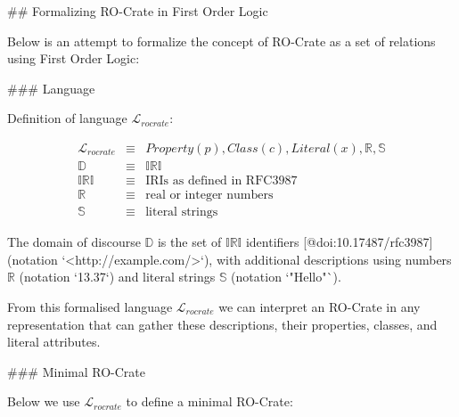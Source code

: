 


\begin{markdown}
## Formalizing RO-Crate in First Order Logic

Below is an attempt to formalize the concept of RO-Crate as a set of relations using First Order Logic:

### Language

\end{markdown}

Definition of language $\mathcal{L}_{rocrate}$:

\begin{eqnarray*}
    \mathcal{L}_{rocrate}   & \equiv & { Property(p), Class(c), 
                            Literal(x), \mathbb{R}, \mathbb{S} } \\
    \mathbb{D}              & \equiv & \mathbb{IRI} \\
    \mathbb{IRI}            & \equiv & { \text{IRIs as defined in RFC3987} } \\
    \mathbb{R}              & \equiv & { \text{real or integer numbers} } \\
    \mathbb{S}              & \equiv & { \text{literal strings} }
\end{eqnarray*}

\begin{markdown}
The domain of discourse $\mathbb{D}$ is the set of $\mathbb{IRI}$ identifiers [@doi:10.17487/rfc3987] (notation `<http://example.com/>`), with additional descriptions using numbers $\mathbb{R}$ (notation `13.37`) and literal strings $\mathbb{S}$ (notation `"Hello"`). 

From this formalised language $\mathcal{L}_{rocrate}$ we can interpret an RO-Crate in any representation that can gather these descriptions, their properties, classes, and literal attributes.  
\end{markdown}

\begin{markdown}
### Minimal RO-Crate

Below we use $\mathcal{L}_{rocrate}$ to define a minimal RO-Crate:
\end{markdown}

